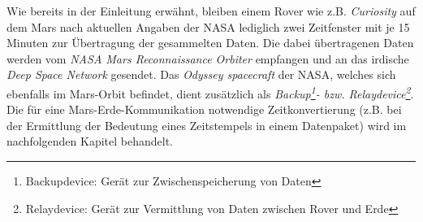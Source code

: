 \label{sec:SendeZeitdauern}

Wie bereits in der Einleitung erw{\"a}hnt, bleiben einem Rover wie z.B.
\textit{Curiosity} auf dem Mars nach aktuellen Angaben der NASA \cite{web5}
lediglich zwei Zeitfenster mit je 15 Minuten zur {\"U}bertragung der gesammelten
Daten. Die dabei {\"u}bertragenen Daten werden vom \textit{NASA Mars
Reconnaissance Orbiter} empfangen und an das irdische \textit{Deep Space
Network} gesendet. Das \textit{Odyssey spacecraft} der NASA, welches
sich ebenfalls im Mars-Orbit befindet, dient zus{\"a}tzlich als
\textit{Backup\footnote{Backupdevice: Ger{\"a}t zur Zwischenspeicherung von
Daten}- bzw.
Relaydevice\footnote{Relaydevice: Ger{\"a}t zur Vermittlung von Daten zwischen
Rover und Erde}}. Die f{\"u}r eine Mars-Erde-Kommunikation notwendige
Zeitkonvertierung (z.B. bei der Ermittlung der Bedeutung eines Zeitstempels in
einem Datenpaket) wird im nachfolgenden Kapitel behandelt.
\label{Empfangsfenster}